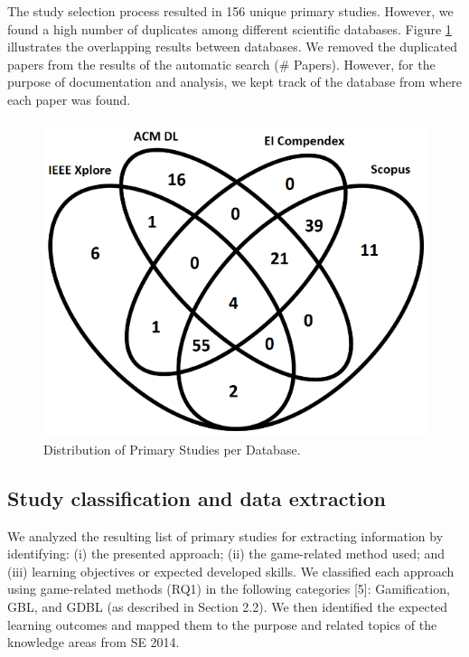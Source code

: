 

The study selection process resulted in 156 unique primary studies. However, we found a high number of duplicates among different scientific databases. Figure \ref{fig:smsdistribution} illustrates the overlapping results between databases. We removed the duplicated papers from the results of the automatic search (\# Papers). However, for the purpose of documentation and analysis, we kept track of the database from where each paper was found. 

\begin{figure}[!h]%
\centering
\includegraphics{img/smsDistribution.png}
\caption{Distribution of Primary Studies per Database.}
\label{fig:smsdistribution}
\end{figure} 

\subsection{Study classification and data extraction}
\label{sec:smsdataextraction}

We analyzed the resulting list of primary studies for extracting information by identifying: (i) the presented approach; (ii) the game-related method used; and (iii) learning objectives or expected developed skills. We classified each approach using game-related methods (RQ1) in the following categories [5]: Gamification, GBL, and GDBL (as described in Section 2.2). 	We then identified the expected learning outcomes and mapped them to the purpose and related topics of the knowledge areas from SE 2014. 

